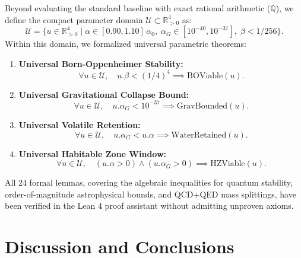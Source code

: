 \documentclass[aps,prd,twocolumn,superscriptaddress,nofootinbib,floatfix]{revtex4-2}
\begin{document}
Beyond evaluating the standard baseline with exact rational arithmetic ($\mathbb{Q}$), we define the compact parameter domain $\mathcal{U} \subset \mathbb{R}_{>0}^4$ as:
\begin{equation}
    \mathcal{U} = \{ u \in \mathbb{R}_{>0}^4 \mid \alpha \in [0.90, 1.10]\,\alpha_0, \; \alpha_G \in [10^{-40}, 10^{-37}], \; \beta < 1/256 \}.
\end{equation}
Within this domain, we formalized universal parametric theorems:
\begin{enumerate}
    \item \textbf{Universal Born-Oppenheimer Stability:}
    \begin{equation}
        \forall u \in \mathcal{U}, \quad u.\beta < (1/4)^4 \implies \text{BOViable}(u).
    \end{equation}
    \item \textbf{Universal Gravitational Collapse Bound:}
    \begin{equation}
        \forall u \in \mathcal{U}, \quad u.\alpha_G < 10^{-37} \implies \text{GravBounded}(u).
    \end{equation}
    \item \textbf{Universal Volatile Retention:}
    \begin{equation}
        \forall u \in \mathcal{U}, \quad u.\alpha_G < u.\alpha \implies \text{WaterRetained}(u).
    \end{equation}
    \item \textbf{Universal Habitable Zone Window:}
    \begin{equation}
        \forall u \in \mathcal{U}, \quad (u.\alpha > 0) \wedge (u.\alpha_G > 0) \implies \text{HZViable}(u).
    \end{equation}
\end{enumerate}
All 24 formal lemmas, covering the algebraic inequalities for quantum stability, order-of-magnitude astrophysical bounds, and QCD+QED mass splittings, have been verified in the Lean 4 proof assistant without admitting unproven axioms.

\section{Discussion and Conclusions}
\label{sec:conclusion}
\end{document}
